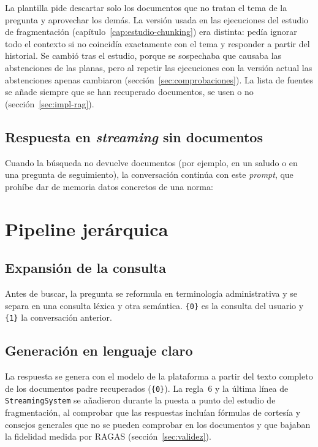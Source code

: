 La plantilla pide descartar solo los documentos que no tratan el tema de la pregunta y aprovechar los demás. La versión usada en las ejecuciones del estudio de fragmentación (capítulo~\ref{cap:estudio-chunking}) era distinta: pedía ignorar todo el contexto si no coincidía exactamente con el tema y responder a partir del historial. Se cambió tras el estudio, porque se sospechaba que causaba las abstenciones de las planas, pero al repetir las ejecuciones con la versión actual las abstenciones apenas cambiaron (sección~\ref{sec:comprobaciones}). La lista de fuentes se añade siempre que se han recuperado documentos, se usen o no (sección~\ref{sec:impl-rag}).

\subsection{Respuesta en \emph{streaming} sin documentos}

Cuando la búsqueda no devuelve documentos (por ejemplo, en un saludo o en una pregunta de seguimiento), la conversación continúa con este \emph{prompt}, que prohíbe dar de memoria datos concretos de una norma:



\section{Pipeline jerárquica}

\subsection{Expansión de la consulta}

Antes de buscar, la pregunta se reformula en terminología administrativa y se separa en una consulta léxica y otra semántica. \texttt{\{0\}} es la consulta del usuario y \texttt{\{1\}} la conversación anterior.



\subsection{Generación en lenguaje claro}

La respuesta se genera con el modelo de la plataforma a partir del texto completo de los documentos padre recuperados (\texttt{\{0\}}). La regla~6 y la última línea de \texttt{StreamingSystem} se añadieron durante la puesta a punto del estudio de fragmentación, al comprobar que las respuestas incluían fórmulas de cortesía y consejos generales que no se pueden comprobar en los documentos y que bajaban la fidelidad medida por RAGAS (sección~\ref{sec:validez}).

